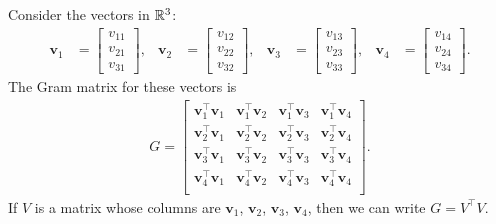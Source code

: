 \begin{example}
    \def\v{\mathbf{v}}
    Consider the vectors in \(\mathbb{R}^3\):
    \begin{align*}
        \v_1 &=
        \begin{bmatrix}
            v_{11} \\ v_{21} \\ v_{31}
        \end{bmatrix},&
        \v_2 &=
        \begin{bmatrix}
            v_{12} \\ v_{22} \\ v_{32}
        \end{bmatrix},&
        \v_3 &=
        \begin{bmatrix}
            v_{13} \\ v_{23} \\ v_{33}
        \end{bmatrix},&
        \v_4 &=
        \begin{bmatrix}
            v_{14} \\ v_{24} \\ v_{34}
        \end{bmatrix}.
    \end{align*}
    The Gram matrix for these vectors is
    \begin{align*}
        G = \begin{bmatrix}
            \v_1^\top \v_1 & \v_1^\top \v_2 & \v_1^\top \v_3 & \v_1^\top \v_4\\[3pt]
            \v_2^\top \v_1 & \v_2^\top \v_2 & \v_2^\top \v_3 & \v_2^\top \v_4\\[3pt]
            \v_3^\top \v_1 & \v_3^\top \v_2 & \v_3^\top \v_3 & \v_3^\top \v_4\\[3pt]
            \v_4^\top \v_1 & \v_4^\top \v_2 & \v_4^\top \v_3 & \v_4^\top \v_4\\
        \end{bmatrix}.
    \end{align*}
    If \(V\) is a matrix whose columns are \(\v_1\), \(\v_2\), \(\v_3\), \(\v_4\), then we can write \(G = V^\top V\).
\end{example}

